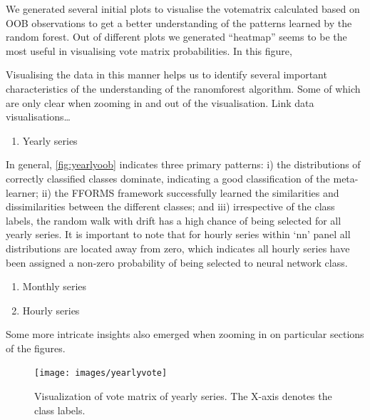\documentclass[11pt,a4paper,]{article}
\providecommand{\tightlist}{%
  \setlength{\itemsep}{0pt}\setlength{\parskip}{0pt}}
\begin{document}
We generated several initial plots to visualise the votematrix calculated based on OOB observations to get a better understanding of the patterns learned by the random forest. Out of different plots we generated ``heatmap'' seems to be the most useful in visualising vote matrix probabilities. In this figure,

Visualising the data in this manner helps us to identify several important characteristics of the understanding of the ranomforest algorithm. Some of which are only clear when zooming in and out of the visualisation. Link data visualisations\ldots{}

\begin{enumerate}
\def\labelenumi{\arabic{enumi}.}
\tightlist
\item
  Yearly series
\end{enumerate}

In general, \autoref{fig:yearlyoob} indicates three primary patterns: i) the distributions of correctly classified classes dominate, indicating a good classification of the meta-learner; ii) the FFORMS framework successfully learned the similarities and dissimilarities between the different classes; and iii) irrespective of the class labels, the random walk with drift has a high chance of being selected for all yearly series. It is important to note that for hourly series within `nn' panel all distributions are located away from zero, which indicates all hourly series have been assigned a non-zero probability of being selected to neural network class.

\begin{enumerate}
\def\labelenumi{\arabic{enumi}.}
\setcounter{enumi}{1}
\item
  Monthly series
\item
  Hourly series
\end{enumerate}

Some more intricate insights also emerged when zooming in on particular sections of the figures.

\newpage

\begin{figure}[h]

{\centering \texttt{[image: images/yearlyvote]} 

}

\caption{Visualization of vote matrix of yearly series. The X-axis denotes the class labels.}\label{fig:unnamed-chunk-1}
\end{figure}
\end{document}
